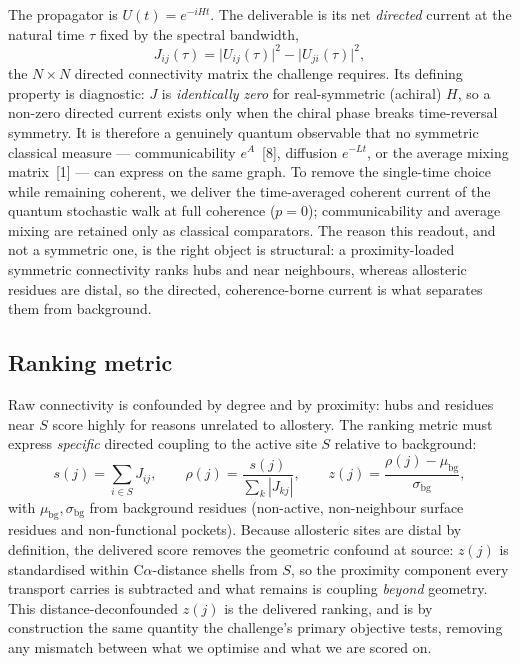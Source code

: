 \documentclass[10pt,a4paper]{article}
\begin{document}
The propagator is $U(t) = e^{-iHt}$. The deliverable is its net \emph{directed} current at the
natural time $\tau$ fixed by the spectral bandwidth,
\begin{equation}
J_{ij}(\tau) = \bigl|U_{ij}(\tau)\bigr|^{2} - \bigl|U_{ji}(\tau)\bigr|^{2},
\end{equation}
the $N\times N$ directed connectivity matrix the challenge requires. Its defining property is
diagnostic: $J$ is \emph{identically zero} for real-symmetric (achiral) $H$, so a non-zero directed
current exists only when the chiral phase breaks time-reversal symmetry. It is therefore a genuinely
quantum observable that no symmetric classical measure --- communicability $e^{A}$~[8],
diffusion $e^{-Lt}$, or the average mixing matrix~[1] --- can express on the same graph.
To remove the single-time choice while remaining coherent, we deliver the time-averaged coherent
current of the quantum stochastic walk at full coherence ($p=0$); communicability and average mixing
are retained only as classical comparators. The reason this readout, and not a symmetric one, is the
right object is structural: a proximity-loaded symmetric connectivity ranks hubs and near neighbours,
whereas allosteric residues are distal, so the directed, coherence-borne current is what separates
them from background.

\subsection{Ranking metric}

Raw connectivity is confounded by degree and by proximity: hubs and residues near $S$ score highly
for reasons unrelated to allostery. The ranking metric must express \emph{specific} directed coupling
to the active site $S$ relative to background:
\begin{equation}
s(j) = \sum_{i \in S} J_{ij}, \qquad
\rho(j) = \frac{s(j)}{\sum_{k} |J_{kj}|}, \qquad
z(j) = \frac{\rho(j) - \mu_{\mathrm{bg}}}{\sigma_{\mathrm{bg}}},
\end{equation}
with $\mu_{\mathrm{bg}},\sigma_{\mathrm{bg}}$ from background residues (non-active, non-neighbour
surface residues and non-functional pockets). Because allosteric sites are distal by definition, the
delivered score removes the geometric confound at source: $z(j)$ is standardised within
C$\alpha$-distance shells from $S$, so the proximity component every transport carries is subtracted
and what remains is coupling \emph{beyond} geometry. This distance-deconfounded $z(j)$ is the
delivered ranking, and is by construction the same quantity the challenge's primary objective tests,
removing any mismatch between what we optimise and what we are scored on.
\end{document}
